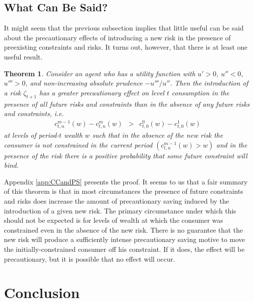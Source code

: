 \documentclass[titlepage]{\econtex}
\newtheorem{theorem}{Theorem}
\begin{document}
\subsection{What Can Be Said?}\label{subsubsec:WhatCanBeSaid}



It might seem that the previous subsection implies that little useful can be said about the precautionary effects of introducing a new risk in the presence of preexisting constraints and risks. It turns out, however, that there is at least one useful result.

\begin{theorem}\label{thm:CCandPS}
	Consider an agent who has a utility function with $u'> 0$, $u''< 0$, $u''' > 0$, and non-increasing absolute prudence $-u'''/u''$. Then the introduction of a risk $\zeta_{t+1}$ has a greater precautionary effect on level $t$ consumption in the presence of all future risks and constraints than in the absence of any future risks and constraints, i.e.
	\begin{eqnarray}
	c_{t,n}^{m-1}(w) - c_{t,n}^{m}(w) & > & c_{t,0}^0(w)-c^{1}_{t,0}(w) \label{eq:whatcanbesaid}
	\end{eqnarray}
	at levels of period-$t$ wealth $w$ such that in the absence of the new risk the consumer is not constrained in the current period $(c_{t,n}^{m-1}(w) > w)$ and in the presence of the risk there is a positive probability that some future constraint will bind.
\end{theorem}

Appendix \ref{app:CCandPS} presents the proof. It seems to us that a fair summary of this theorem is that in most circumstances the presence of future constraints and risks does increase the amount of precautionary saving induced by the introduction of a given new risk.  The primary circumstance under which this should not be expected is for levels of wealth at which the consumer was constrained even in the absence of the new risk. There is no guarantee that the new risk will produce a sufficiently intense precautionary saving motive to move the initially-constrained consumer off his constraint.  If it does, the effect will be precautionary, but it is possible that no effect will occur.


\section{Conclusion}
\end{document}
